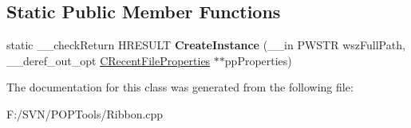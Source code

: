 \subsection*{Static Public Member Functions}
\begin{DoxyCompactItemize}
\item 
\hypertarget{class_c_recent_file_properties_a685d5156bd3104a3b20ae8f98fd9680e}{static \-\_\-\-\_\-check\-Return H\-R\-E\-S\-U\-L\-T {\bfseries Create\-Instance} (\-\_\-\-\_\-in P\-W\-S\-T\-R wsz\-Full\-Path, \-\_\-\-\_\-deref\-\_\-out\-\_\-opt \hyperlink{class_c_recent_file_properties}{C\-Recent\-File\-Properties} $\ast$$\ast$pp\-Properties)}\label{class_c_recent_file_properties_a685d5156bd3104a3b20ae8f98fd9680e}

\end{DoxyCompactItemize}


The documentation for this class was generated from the following file\-:\begin{DoxyCompactItemize}
\item 
F\-:/\-S\-V\-N/\-P\-O\-P\-Tools/Ribbon.\-cpp\end{DoxyCompactItemize}
